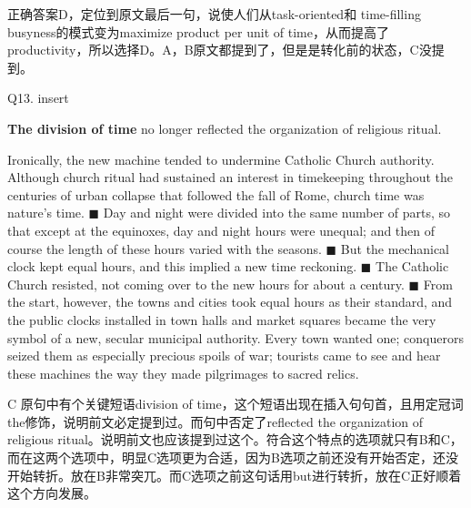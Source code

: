 \begin{blk}
    \begin{nlz}
        正确答案D，定位到原文最后一句，说使人们从task-oriented和 time-filling busyness的模式变为maximize product per unit of time，从而提高了productivity，所以选择D。A，B原文都提到了，但是是转化前的状态，C没提到。
    \end{nlz}

    \begin{qst}
        Q13. insert

        \textbf{The division of time} no longer reflected the organization of religious ritual.
    \end{qst}

    \begin{psgq}
        Ironically, the new machine tended to undermine Catholic Church authority. Although church ritual had sustained an interest in timekeeping throughout the centuries of urban collapse that followed the fall of Rome, church time was nature’s time. $\blacksquare$ Day and night were divided into the same number of parts, so that except at the equinoxes, day and night hours were unequal; and then of course the length of these hours varied with the seasons. $\blacksquare$ But the mechanical clock kept equal hours, and this implied a new time reckoning. $\blacksquare$ The Catholic Church resisted, not coming over to the new hours for about a century. $\blacksquare$ From the start, however, the towns and cities took equal hours as their standard, and the public clocks installed in town halls and market squares became the very symbol of a new, secular municipal authority. Every town wanted one; conquerors seized them as especially precious spoils of war; tourists came to see and hear these machines the way they made pilgrimages to sacred relics.
    \end{psgq}

    \begin{nlz}
        C 原句中有个关键短语division of time，这个短语出现在插入句句首，且用定冠词the修饰，说明前文必定提到过。而句中否定了reflected the organization of religious ritual。说明前文也应该提到过这个。符合这个特点的选项就只有B和C，而在这两个选项中，明显C选项更为合适，因为B选项之前还没有开始否定，还没开始转折。放在B非常突兀。而C选项之前这句话用but进行转折，放在C正好顺着这个方向发展。
    \end{nlz}
\end{blk}
